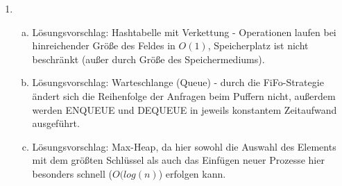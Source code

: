 \documentclass{scrartcl}
\begin{document}
\begin{enumerate}[(1)]
\item
\begin{enumerate}[(a)]
\item Lösungsvorschlag: Hashtabelle mit Verkettung - Operationen laufen bei hinreichender Größe des Feldes in $O(1)$, Speicherplatz ist nicht beschränkt (außer durch Größe des Speichermediums).
\item Lösungsvorschlag: Warteschlange (Queue) - durch die FiFo-Strategie ändert sich die Reihenfolge der Anfragen beim Puffern nicht, außerdem werden ENQUEUE und DEQUEUE in jeweils konstantem Zeitaufwand ausgeführt.
\item Lösungsvorschlag: Max-Heap, da hier sowohl die Auswahl des Elements mit dem größten Schlüssel als auch das Einfügen neuer Prozesse hier besonders schnell ($O(log(n)$) erfolgen kann. 
\end{enumerate}


\end{enumerate}
\end{document}
